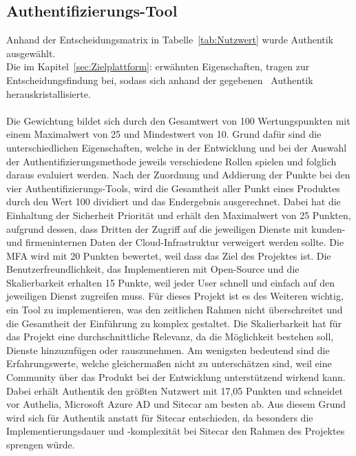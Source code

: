 \subsection{Authentifizierungs-Tool}
\label{sec:Authentifizierungs-Tool}
Anhand der Entscheidungsmatrix in Tabelle~\ref{tab:Nutzwert} wurde Authentik ausgewählt. 
\\Die im Kapitel~\ref{sec:Zielplattform}:  erwähnten Eigenschaften, tragen zur 
Entscheidungsfindung bei, sodass sich anhand der gegebenen~ Authentik herauskristallisierte.
\\
\\Die Gewichtung bildet sich durch den Gesamtwert von 100 Wertungspunkten mit einem Maximalwert von 25 und Mindestwert von 10. 
Grund dafür sind die unterschiedlichen Eigenschaften, welche in der Entwicklung und bei der Auswahl der 
Authentifizierungsmethode jeweils verschiedene Rollen spielen und folglich daraus evaluiert werden. Nach der Zuordnung 
und Addierung der Punkte bei den vier Authentifizierungs-Tools, wird die Gesamtheit aller Punkt eines Produktes durch den 
Wert 100 dividiert und das Endergebnis ausgerechnet. Dabei hat die Einhaltung der Sicherheit Priorität und erhält den 
Maximalwert von 25 Punkten, aufgrund dessen, dass Dritten der Zugriff auf die jeweiligen Dienste mit kunden- und 
firmeninternen Daten der Cloud-Infrastruktur verweigert werden sollte. Die \acs*{MFA} wird mit 20 Punkten bewertet, weil 
dass das Ziel des Projektes ist. Die Benutzerfreundlichkeit, das Implementieren mit Open-Source und die Skalierbarkeit 
erhalten 15 Punkte, weil jeder User schnell und einfach auf den jeweiligen Dienst zugreifen muss. 
Für dieses Projekt ist es des Weiteren wichtig, ein Tool zu implementieren, was den zeitlichen Rahmen nicht überschreitet und die 
Gesamtheit der Einführung zu komplex gestaltet. Die Skalierbarkeit hat für das Projekt eine durchschnittliche Relevanz, da die 
Möglichkeit bestehen soll, Dienste hinzuzufügen oder rauszunehmen. Am wenigsten bedeutend sind die Erfahrungswerte, welche 
gleichermaßen nicht zu unterschätzen sind, weil eine Community über das Produkt bei der Entwicklung unterstützend wirkend kann.
\\Dabei erhält Authentik den größten Nutzwert mit 17,05 Punkten und schneidet vor Authelia, Microsoft Azure AD und Sitecar am besten ab. 
Aus diesem Grund wird sich für Authentik anstatt für Sitecar entschieden, da besonders die Implementierungsdauer und -komplexität 
bei Sitecar den Rahmen des Projektes sprengen würde.

